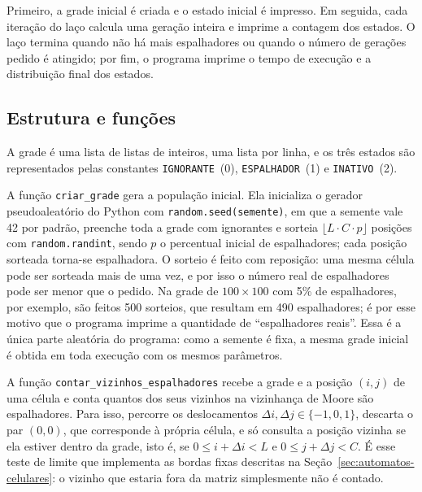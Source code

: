 Primeiro, a grade inicial é criada e o estado inicial é impresso. Em seguida, cada iteração do laço calcula uma geração inteira e imprime a contagem dos estados. O laço termina quando não há mais espalhadores ou quando o número de gerações pedido é atingido; por fim, o programa imprime o tempo de execução e a distribuição final dos estados.

\subsection{Estrutura e funções}\label{sub:funcoes-sequencial}

A grade é uma lista de listas de inteiros, uma lista por linha, e os três estados são representados pelas constantes \texttt{IGNORANTE}~(0), \texttt{ESPALHADOR}~(1) e \texttt{INATIVO}~(2).

A função \texttt{criar\_grade} gera a população inicial. Ela inicializa o gerador pseudoaleatório do Python com \texttt{random.seed(semente)}, em que a semente vale 42 por padrão, preenche toda a grade com ignorantes e sorteia $\lfloor L \cdot C \cdot p \rfloor$ posições com \texttt{random.randint}, sendo $p$ o percentual inicial de espalhadores; cada posição sorteada torna-se espalhadora. O sorteio é feito com reposição: uma mesma célula pode ser sorteada mais de uma vez, e por isso o número real de espalhadores pode ser menor que o pedido. Na grade de $100 \times 100$ com 5\% de espalhadores, por exemplo, são feitos 500 sorteios, que resultam em 490 espalhadores; é por esse motivo que o programa imprime a quantidade de ``espalhadores reais''. Essa é a única parte aleatória do programa: como a semente é fixa, a mesma grade inicial é obtida em toda execução com os mesmos parâmetros.

A função \texttt{contar\_vizinhos\_espalhadores} recebe a grade e a posição $(i, j)$ de uma célula e conta quantos dos seus vizinhos na vizinhança de Moore são espalhadores. Para isso, percorre os deslocamentos $\Delta i, \Delta j \in \{-1, 0, 1\}$, descarta o par $(0, 0)$, que corresponde à própria célula, e só consulta a posição vizinha se ela estiver dentro da grade, isto é, se $0 \le i + \Delta i < L$ e $0 \le j + \Delta j < C$. É esse teste de limite que implementa as bordas fixas descritas na Seção~\ref{sec:automatos-celulares}: o vizinho que estaria fora da matriz simplesmente não é contado.

